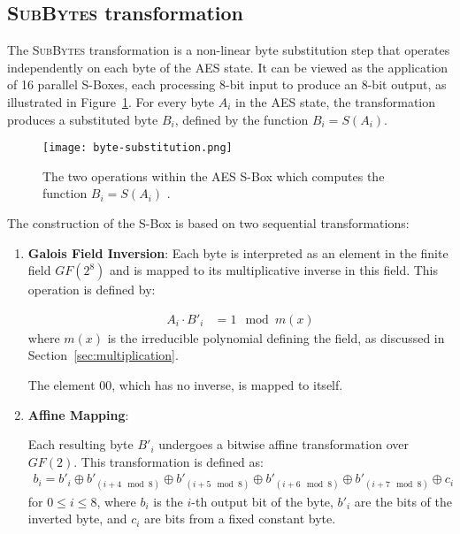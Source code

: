 \subsection{\textsc{SubBytes} transformation}
\label{sec:SubBytes}

The \textsc{SubBytes} transformation is a non-linear byte substitution step that operates independently on each byte of the AES state. 
It can be viewed as the application of 16 parallel S-Boxes, each processing 8-bit input to produce an 8-bit output, as illustrated in Figure~\ref{fig:byte-substitution}. 
For every byte $A_i$ in the \gls{AES} state, the transformation produces a substituted byte $B_i$, defined by the function $B_i = S(A_i)$.

\begin{figure}[!ht] 
    \centering
    \texttt{[image: byte-substitution.png]} 
    \caption{
        The two operations within the AES S-Box which computes the function $B_i = S(A_i)$ \cite{Paar2024}.
    }
    \label{fig:byte-substitution} 
\end{figure}

The construction of the S-Box is based on two sequential transformations:
\begin{enumerate}
    \item \textbf{Galois Field Inversion}: 
    Each byte is interpreted as an element in the finite field $GF(2^8)$ and is mapped to its multiplicative inverse in this field. 
    This operation is defined by:
    
    \begin{align}
        A_i \cdot {B'}_i &= 1 \mod m(x)
        \label{eq:gfi}
    \end{align}
    where $m(x)$ is the irreducible polynomial defining the field, as discussed in Section~\ref{sec:multiplication}. 

    The element ${00}$, which has no inverse, is mapped to itself.

    \item \textbf{Affine Mapping}:
    
    Each resulting byte ${B'}_i$ undergoes a bitwise affine transformation over $GF(2)$. 
    This transformation is defined as:
    \begin{align}
        b_i = {b'}_i \oplus {b'}_{(i+4 \mod 8)} \oplus {b'}_{(i+5 \mod 8)} \oplus {b'}_{(i+6 \mod 8)} \oplus {b'}_{(i+7 \mod 8)} \oplus c_i
    \end{align}
    for $0 \leq i \leq 8$, where $b_i$ is the $i$-th output bit of the byte, ${b'}_i$ are the bits of the inverted byte, and $c_i$ are bits from a fixed constant byte.
\end{enumerate}


